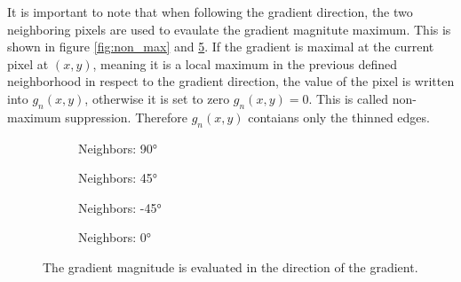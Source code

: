 It is important to note that when following the gradient direction, the two neighboring pixels are used to evaulate the gradient magnitute maximum. This is shown in figure \ref{fig:non_max} and \ref{fig:neighbors}.
If the gradient is maximal at the current pixel at $(x,y)$, meaning it is a local maximum in the previous defined neighborhood in respect to the gradient direction, the value of the pixel is written into $g_n(x,y)$, otherwise it is set to zero $g_n(x,y) = 0$. This is called non-maximum suppression. Therefore $g_n(x,y)$ contaians only the thinned edges.  

\begin{figure}[ht]
    \centering
    \begin{subfigure}[b]{0.23\textwidth}
        \centering
        \caption{Neighbors: 90°}
        \label{fig:n90}
    \end{subfigure}%
    \begin{subfigure}[b]{0.23\textwidth}
        \centering
        \caption{Neighbors: 45°}
        \label{fig:n45}
    \end{subfigure}%
    \begin{subfigure}[b]{0.23\textwidth}
        \centering
        \caption{Neighbors: -45°}
        \label{fig:nn45}
    \end{subfigure}%
    \begin{subfigure}[b]{0.23\textwidth}
        \centering
        \caption{Neighbors: 0°}
        \label{fig:n0}
    \end{subfigure}
    \caption{The gradient magnitude is evaluated in the direction of the gradient.}
    \label{fig:neighbors}
\end{figure}

